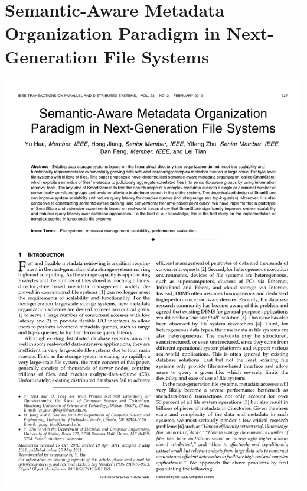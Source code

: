 \section{Semantic-Aware Metadata Organization Paradigm in Next-Generation File Systems}
\hspace*{-1.5cm}
\includegraphics[page=1,scale=0.75]{./appendix/SM2012.pdf}
	

